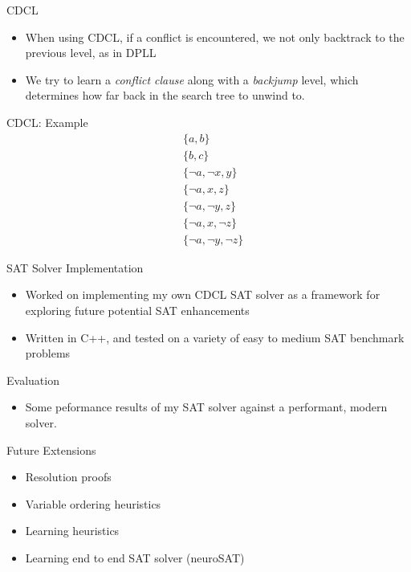 \documentclass{beamer}
\begin{document}
\begin{frame}{CDCL}
\begin{itemize}
    \item When using CDCL, if a conflict is encountered, we not only backtrack to the previous level, as in DPLL
    \item We try to learn a \textit{conflict clause} along with a \textit{backjump} level, which determines how far back in the search tree to unwind to.
\end{itemize}
\end{frame}

\begin{frame}{CDCL: Example}
    \begin{align*}
        &\{a,b\}\\
        &\{b,c\}\\
        &\{\neg a, \neg x, y\} \\
        &\{\neg a, x, z\} \\
        &\{ \neg a, \neg y, z\} \\
        &\{ \neg a, x, \neg z\} \\
        &\{ \neg a, \neg y, \neg z\}
    \end{align*}
\end{frame}

\begin{frame}{SAT Solver Implementation}
    \begin{itemize}
        \item Worked on implementing my own CDCL SAT solver as a framework for exploring future potential SAT enhancements
        \item Written in C++, and tested on a variety of easy to medium SAT benchmark problems
    \end{itemize}
\end{frame}

\begin{frame}{Evaluation}
    \begin{itemize}
        \item Some peformance results of my SAT solver against a performant, modern solver.
    \end{itemize}
\end{frame}

\begin{frame}{Future Extensions}
    \begin{itemize}
        \item Resolution proofs
        \item Variable ordering heuristics
        \item Learning heuristics
        \item Learning end to end SAT solver (neuroSAT)
    \end{itemize}
\end{frame}



\end{document}
